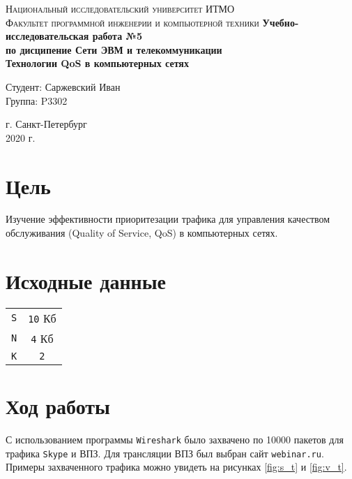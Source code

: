 \documentclass[12pt, a4paper]{article}
\begin{document}
\begin{titlepage}
\begin{center}

\textsc{Национальный исследовательский университет ИТМО\\[4mm]
Факультет программной инженерии и компьютерной техники}
\vfill
\textbf{Учебно-исследовательская работа №5\\[4mm]
по дисципение Сети ЭВМ и телекоммуникации\\[4mm]
Технологии QoS в компьютерных сетях\\[16mm]
}
\begin{flushright}
Студент: Саржевский Иван
\\[2mm]Группа: P3302
\end{flushright}
\vfill
г. Санкт-Петербург\\[2mm]
2020 г.

\end{center}
\end{titlepage}

\tableofcontents
\newpage

\justify

\section{Цель}

Изучение эффективности приоритезации трафика для управления качеством
обслуживания (Quality of Service, QoS) в компьютерных сетях. 

\section{Исходные данные}

\begin{center}
\begin{tabular}{c c}
  \texttt{S} & \texttt{10} Кб\\
  \texttt{N} & \texttt{4} Кб\\
  \texttt{K} & \texttt{2}\\
\end{tabular}
\end{center}

\section{Ход работы}

С использованием программы \texttt{Wireshark} было захвачено по 10000
пакетов для трафика \texttt{Skype} и ВПЗ. Для трансляции ВПЗ был выбран
сайт \texttt{webinar.ru}. Примеры захваченного трафика можно увидеть на
рисунках \ref{fig:s_t} и \ref{fig:v_t}.
\end{document}

